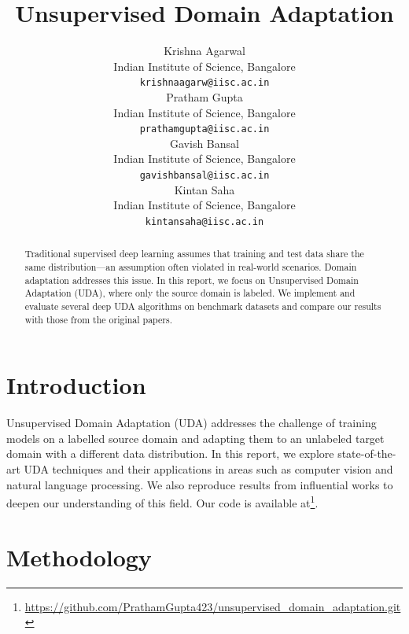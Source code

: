 \documentclass{article}
\title{Unsupervised Domain Adaptation}
\author{ Krishna Agarwal\\%
  Indian Institute of Science, Bangalore\\
  \texttt{krishnaagarw@iisc.ac.in} \\
   \And
  {Pratham Gupta} \\
  Indian Institute of Science, Bangalore\\
  \texttt{prathamgupta@iisc.ac.in} \\
   \And
   {Gavish Bansal} \\
   Indian Institute of Science, Bangalore\\
   \texttt{gavishbansal@iisc.ac.in} \\
   \And
   {Kintan Saha} \\
   Indian Institute of Science, Bangalore\\
   \texttt{kintansaha@iisc.ac.in} \\
}
\begin{document}
\graphicspath{{./images/}}

\maketitle


\begin{abstract}
  Traditional supervised deep learning assumes that training and test data share the same distribution—an assumption often violated in real-world scenarios. Domain adaptation addresses this issue. In this report, we focus on Unsupervised Domain Adaptation (UDA), where only the source domain is labeled. We implement and evaluate several deep UDA algorithms on benchmark datasets and compare our results with those from the original papers.
\end{abstract}


\section{Introduction}
Unsupervised Domain Adaptation (UDA) addresses the challenge of training models on a labelled source domain and adapting them to an unlabeled target domain with a different data distribution. In this report, we explore state-of-the-art UDA techniques and their applications in areas such as computer vision and natural language processing. We also reproduce results from influential works \cite{ganin2016domainadversarialtrainingneuralnetworks,survey,Ben-David2010} to deepen our understanding of this field. Our code is available at\footnote{\href{https://github.com/PrathamGupta423/unsupervised_domain_adaptation.git}{https://github.com/PrathamGupta423/unsupervised\_domain\_adaptation.git}}.


\section{Methodology}
\end{document}
